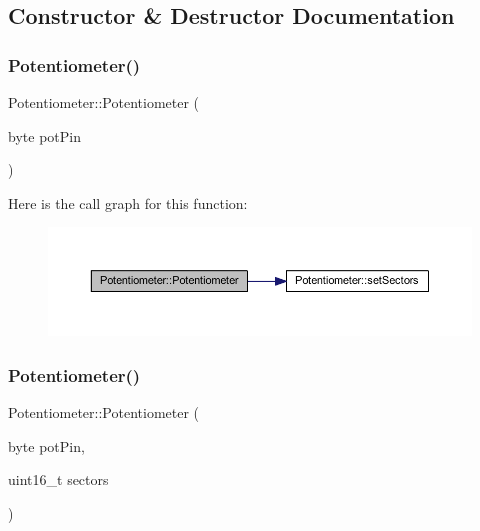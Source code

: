 \subsection{Constructor \& Destructor Documentation}
\mbox{\label{class_potentiometer_a15bc5c613ca3c66b54cb816af5935c1b}} 
\subsubsection{\texorpdfstring{Potentiometer()}{Potentiometer()}\hspace{0.1cm}{\footnotesize\ttfamily [1/2]}}
{\footnotesize\ttfamily Potentiometer\+::\+Potentiometer (\begin{DoxyParamCaption}\item[{byte}]{pot\+Pin }\end{DoxyParamCaption})}

Here is the call graph for this function\+:
\nopagebreak
\begin{figure}[H]
\begin{center}
\leavevmode
\includegraphics[width=350pt]{d3/d10/class_potentiometer_a15bc5c613ca3c66b54cb816af5935c1b_cgraph}
\end{center}
\end{figure}
\mbox{\label{class_potentiometer_af91e2477f31efbb3b7ebfedb427007ff}} 
\subsubsection{\texorpdfstring{Potentiometer()}{Potentiometer()}\hspace{0.1cm}{\footnotesize\ttfamily [2/2]}}
{\footnotesize\ttfamily Potentiometer\+::\+Potentiometer (\begin{DoxyParamCaption}\item[{byte}]{pot\+Pin,  }\item[{uint16\+\_\+t}]{sectors }\end{DoxyParamCaption})}

